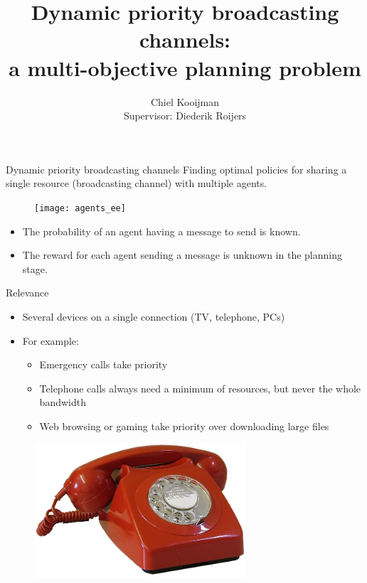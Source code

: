 \documentclass{beamer}
\author{Chiel Kooijman\\ Supervisor: Diederik Roijers}
\title{Dynamic priority broadcasting channels:\\a multi-objective planning problem}
\begin{document}
\frame{\titlepage}



\begin{frame}{Dynamic priority broadcasting channels}
	Finding optimal policies for sharing a single resource (broadcasting
	channel) with multiple agents.
	\begin{figure}
		\centering
		\texttt{[image: agents\_ee]}
	   \label{fig:agents_ee}
	\end{figure}
	\begin{itemize}
		\item The probability of an agent having a message to send is known.
		\item The reward for each agent sending a message is unknown in the
			planning stage.
	\end{itemize}
\end{frame}


\begin{frame}{Relevance}
	\begin{itemize}
		\item Several devices on a single connection (TV, telephone, PCs)
		\item For example:
		\begin{itemize}
			\item Emergency calls take priority
			\item Telephone calls always need a minimum of resources, but never
				the whole bandwidth
			\item Web browsing or gaming take priority over downloading large files
		\end{itemize}
	\end{itemize}
	\begin{figure}
		\includegraphics[height=5cm]{telephone}
	   \label{fig:telephone}
	\end{figure}
\end{frame}
\end{document}
